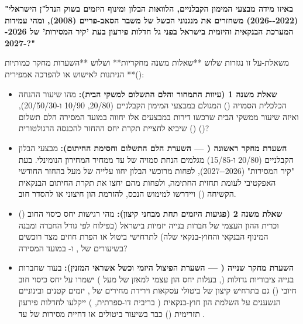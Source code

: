 \begin{modelbox}
\textbf{"באיזו מידה מבצעי המימון הקבלניים, הלוואות הבלון ומינוף היזמים בשוק הנדל"ן הישראלי (\num{2022--2026}) משחזרים את מנגנוני הכשל של משבר הסאב-פריים (\num{2008}), ומהי עמידות המערכת הבנקאית והיזמית בישראל בפני גל חדלות פירעון בעת 'קיר המסירות' של \num{2026--2027}?"}
\end{modelbox}

משאלת-על זו נגזרות שלוש **שאלות משנה מחקריות** ושלוש **השערות מחקר כמותיות ()** הניתנות לאישוש או להפרכה אמפירית:

\begin{itemize}[leftmargin=*, itemsep=4pt]
  \item \textbf{שאלת משנה 1 (עיוות התמחור והלם התשלום למשקי הבית):} מהו שיעור ההנחה הכלכלית הסמויה () המגולם במבצעי המימון הקבלניים (\num{20/80}, \num{10/90} ו-\num{20/50/30}), ואיזה שיעור ממשקי הבית שרכשו דירות במבצעים אלו יחווה במועד המסירה הלם תשלום () שיביא לחציית תקרת יחס ההחזר להכנסה הרגולטורית ()?
  \item \textbf{השערת מחקר ראשונה ( --- השערת הלם התשלום וחסימת החיתום):} מבצעי הבלון הקבלניים (\num{20/80} ו-\num{15/85}) מגלמים הנחת  סמויה של  עד  ממחיר המחירון הנומינלי. בעת "קיר המסירות" (\num{2026--2027}), לפחות  מרוכשי הבלון יחוו עלייה של מעל  בהחזר החודשי האפקטיבי לעומת תחזית החתימה, ולפחות  מהם יחצו את תקרת החיתום הבנקאית הקשיחה () ויידרשו למימוש הנכס, להזרמת הון חיצוני או להסדר חוב.

  \item \textbf{שאלת משנה 2 (פגיעות היזמים תחת מבחני קיצון):} מהי רגישות יחס כיסוי החוב () וכרית ההון העצמי של חברות בנייה יזמיות בישראל (בפילוח לפי גודל החברה ומבנה המינוף הבנקאי והחוץ-בנקאי שלה) לתרחישי ביטול או הפרת חוזים מצד רוכשים בשיעורים של ,  ו- במועד המסירה?
  \item \textbf{השערת מחקר שנייה ( --- השערת הפיצול היזמי וכשל אשראי המזנין):} בעוד שחברות בנייה ציבוריות גדולות (, בעלות יחס הון עצמי למאזן של מעל ) ישמרו על יחס כיסוי חוב חיובי () גם בתרחיש קיצון של  ביטולי עסקאות וירידת מחירים של , יזמים קטנים ובינוניים הנשענים על השלמת הון חוץ-בנקאית ( בריבית דו-ספרתית, ) ייקלעו לחדלות פירעון תזרימית () כבר בשיעור ביטולים או דחיית מסירות של  עד .


\end{itemize}

